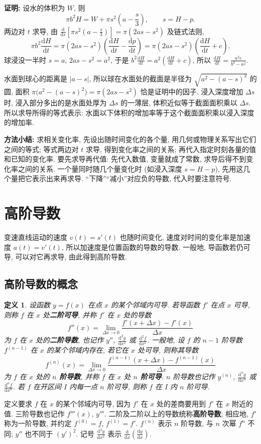 \documentclass[UTF8,openany]{ctexbook}
\theoremstyle{chinesetextbook}
\newenvironment{cnproof}{\par\indent\textbf{证明:} \ignorespaces}{\par}
\newtheorem*{definitionsingle}{定义}
\newcommand{\dd}{\mathrm d}
\begin{document}
\begin{cnproof}
设水的体积为 $W$, 则
\[
\pi b^2H=W+\pi s^2\left(a-\frac s3\right),\qquad s=H-p.
\]
两边对 $t$ 求导, 由 $\displaystyle\frac{\dd}{\dd s}\left[\pi s^2\left(a-\frac s3\right)\right]=\pi(2as-s^2)$ 及链式法则,
\[
\pi b^2\frac{\dd H}{\dd t}=\pi(2as-s^2)\left(\frac{\dd H}{\dd t}-\frac{\dd p}{\dd t}\right)=\pi(2as-s^2)\left(\frac{\dd H}{\dd t}+c\right).
\]
球浸没一半时 $s=a$, $2as-s^2=a^2$, 于是 $\displaystyle b^2\frac{\dd H}{\dd t}=a^2\left(\frac{\dd H}{\dd t}+c\right)$, 所以 $\displaystyle\frac{\dd H}{\dd t}=\frac{a^2c}{b^2-a^2}$.
\end{cnproof}
水面到球心的距离是 $|a-s|$, 所以球在水面处的截面是半径为 $\sqrt{a^2-(a-s)^2}$ 的圆, 面积 $\pi\bigl(a^2-(a-s)^2\bigr)=\pi(2as-s^2)$ 恰是证明中的因子. 浸入深度增加 $\Delta s$ 时, 浸入部分多出的是水面处厚为 $\Delta s$ 的一薄层, 体积近似等于截面面积乘以 $\Delta s$. 所以求导所得的等式表示: 水面以下体积的增加率等于这个截面面积乘以浸入深度的增加率.
\par\indent\textbf{方法小结:} 求相关变化率, 先设出随时间变化的各个量, 用几何或物理关系写出它们之间的等式; 等式两边对 $t$ 求导, 得到变化率之间的关系; 再代入指定时刻各量的值和已知的变化率. 要先求导再代值: 先代入数值, 变量就成了常数, 求导后得不到变化率之间的关系. 一个量同时随几个量变化时 (如浸入深度 $s=H-p$), 先用这几个量把它表示出来再求导. “下降”“减小”对应负的导数, 代入时要注意符号.
\section{高阶导数}
变速直线运动的速度 $v(t)=s'(t)$ 也随时间变化, 速度对时间的变化率是加速度 $a(t)=v'(t)$, 所以加速度是位置函数的导数的导数. 一般地, 导函数若仍可导, 可以对它再求导, 由此得到高阶导数.
\subsection{高阶导数的概念}
\begin{definitionsingle}
设函数 $y=f(x)$ 在点 $x$ 的某个邻域内可导. 若导函数 $f'$ 在点 $x$ 可导, 则称 $f$ 在 $x$ 处\textbf{二阶可导}, 并称 $f'$ 在 $x$ 处的导数
\[
f''(x)=\lim_{\Delta x\to0}\frac{f'(x+\Delta x)-f'(x)}{\Delta x}
\]
为 $f$ 在 $x$ 处的\textbf{二阶导数}, 也记作 $y''$, $\displaystyle\frac{\dd^2y}{\dd x^2}$ 或 $\displaystyle\frac{\dd^2f}{\dd x^2}$. 一般地, 设 $f$ 的 $n-1$ 阶导数 $f^{(n-1)}$ 在 $x$ 的某个邻域内存在, 若它在 $x$ 处可导, 则称其导数
\[
f^{(n)}(x)=\lim_{\Delta x\to0}\frac{f^{(n-1)}(x+\Delta x)-f^{(n-1)}(x)}{\Delta x}
\]
为 $f$ 在 $x$ 处的 \textbf{$n$ 阶导数}, 并称 $f$ 在 $x$ 处 \textbf{$n$ 阶可导}. $n$ 阶导数也记作 $y^{(n)}$, $\displaystyle\frac{\dd^ny}{\dd x^n}$ 或 $\displaystyle\frac{\dd^nf}{\dd x^n}$. 若 $f$ 在开区间 $I$ 内每一点 $n$ 阶可导, 则称 $f$ 在 $I$ 内 $n$ 阶可导.
\end{definitionsingle}
定义要求 $f$ 在 $x$ 的某个邻域内可导, 因为 $f'$ 在 $x$ 处的差商要用到 $f'$ 在 $x$ 附近的值. 三阶导数也记作 $f'''(x)$, $y'''$. 二阶及二阶以上的导数统称\textbf{高阶导数}; 相应地, $f'$ 称为一阶导数, 并约定 $f^{(0)}=f$, $f^{(1)}=f'$. $f^{(n)}$ 表示 $n$ 阶导数, 与 $n$ 次幂 $f^n$ 不同; $y''$ 也不同于 $(y')^2$. 记号 $\displaystyle\frac{\dd^2y}{\dd x^2}$ 表示 $\displaystyle\frac{\dd}{\dd x}\left(\frac{\dd y}{\dd x}\right)$.
\end{document}
